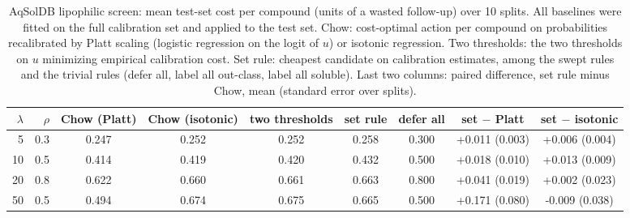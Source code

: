 \begin{table}[ht]
\centering
\caption{AqSolDB lipophilic screen: mean test-set cost per compound (units of a wasted follow-up) over 10 splits. All baselines were fitted on the full calibration set and applied to the test set. Chow: cost-optimal action per compound on probabilities recalibrated by Platt scaling (logistic regression on the logit of $u$) or isotonic regression. Two thresholds: the two thresholds on $u$ minimizing empirical calibration cost. Set rule: cheapest candidate on calibration estimates, among the swept rules and the trivial rules (defer all, label all out-class, label all soluble). Last two columns: paired difference, set rule minus Chow, mean (standard error over splits).}
\label{tab:chow}
\small
\begin{tabular}{rrccccccc}
\toprule
$\lambda$ & $\rho$ & Chow (Platt) & Chow (isotonic) & two thresholds & set rule & defer all & set $-$ Platt & set $-$ isotonic \\
\midrule
5 & 0.3 & 0.247 & 0.252 & 0.252 & 0.258 & 0.300 & +0.011 (0.003) & +0.006 (0.004) \\
10 & 0.5 & 0.414 & 0.419 & 0.420 & 0.432 & 0.500 & +0.018 (0.010) & +0.013 (0.009) \\
20 & 0.8 & 0.622 & 0.660 & 0.661 & 0.663 & 0.800 & +0.041 (0.019) & +0.002 (0.023) \\
50 & 0.5 & 0.494 & 0.674 & 0.675 & 0.665 & 0.500 & +0.171 (0.080) & -0.009 (0.038) \\
\bottomrule
\end{tabular}
\end{table}
